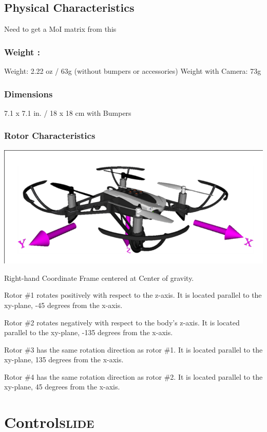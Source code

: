 \documentclass[11pt]{article}
\begin{document}
\subsection{Physical Characteristics}
\label{sec:org2d9f1d2}
Need to get a MoI matrix from this
\subsubsection{Weight :}
\label{sec:org8572236}
Weight: 2.22 oz / 63g (without bumpers or accessories)
Weight with Camera: 73g
\subsubsection{Dimensions}
\label{sec:org5b92d0e}
7.1 x 7.1 in. / 18 x 18 cm with Bumpers
\subsubsection{Rotor Characteristics}
\label{sec:org75abfd6}

\begin{center}
\includegraphics[width=.9\linewidth]{./images/screenshot-04.png}
\end{center}

Right-hand Coordinate Frame centered at Center of gravity.

Rotor \#1 rotates positively with respect to the z-axis. It is located parallel to the xy-plane, -45 degrees from the x-axis.

Rotor \#2 rotates negatively with respect to the body's z-axis. It is located parallel to the xy-plane, -135 degrees from the x-axis.

Rotor \#3 has the same rotation direction as rotor \#1. It is located parallel to the xy-plane, 135 degrees from the x-axis.

Rotor \#4 has the same rotation direction as rotor \#2. It is located parallel to the xy-plane, 45 degrees from the x-axis.

\section{Control\hfill{}\textsc{slide}}
\label{sec:org58a2a5f}
\end{document}
